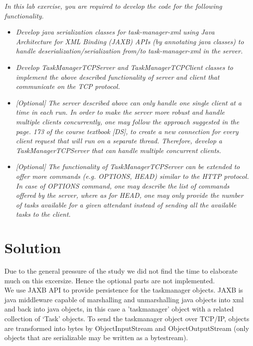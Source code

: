 \textit{In this lab exercise, you are required to develop the code for the following functionality.}\\

\begin{itemize}
\item \textit{Develop java serialization classes for task-manager-xml using Java Architecture for XML Binding (JAXB) APIs (by annotating java classes) to handle deserialization/serialization from/to task-manager-xml in the server.}\\

\item \textit{Develop TaskManagerTCPServer and TaskManagerTCPClient classes to implement the above described functionality of server and client that communicate on the TCP protocol.}\\

\item \textit{[Optional] The server described above can only handle one single client at a time in each run. In order to make the server more robust and handle multiple clients concurrently, one may follow the approach suggested in the page. 173 of the course textbook [DS], to create a new connection for every client request that will run on a separate thread. Therefore, develop a TaskManagerTCPServer that can handle multiple concurrent clients.}\\

\item \textit{[Optional] The functionality of TaskManagerTCPServer can be extended to offer more commands (e.g. OPTIONS, HEAD) similar to the HTTP protocol. In case of OPTIONS command, one may describe the list of commands offered by the server, where as for HEAD, one may only provide the number of tasks available for a given attendant instead of sending all the available tasks to the client.}\\

\end{itemize}

\section{Solution}
\label{tcp_solution}

Due to the general pressure of the study we did not find the time to elaborate much on this excersize. Hence the optional parts are not implemented.\\

We use JAXB API to provide persistence for the taskmanager objects. JAXB is java middleware capable of marshalling and unmarshalling java objects into xml and back into java objects, in this case a 'taskmanager' object with a related collection of ‘Task’ objects. To send the taskmanager object over TCP/IP, objects are transformed into bytes by ObjectInputStream and ObjectOutputStream (only objects that are serializable may be written as a bytestream).   \\ 

